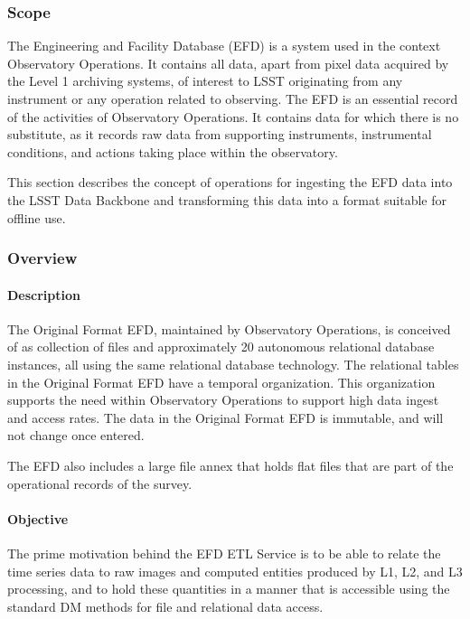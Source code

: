 \subsubsection{Scope}

The Engineering and Facility Database (EFD) is a system used in the
context Observatory Operations. It contains all data, apart from pixel
data acquired by the Level 1 archiving systems, of interest to LSST
originating from any instrument or any operation related to
observing. The EFD is an essential record of the activities of
Observatory Operations. It contains data for which there is no
substitute, as it records raw data from supporting instruments,
instrumental conditions, and actions taking place within the
observatory.

This section describes the concept of operations for ingesting the
EFD data into the LSST Data Backbone and transforming this data
into a format suitable for offline use.

\subsubsection{Overview}

\paragraph{Description}

The Original Format EFD, maintained by Observatory Operations, is
conceived of as collection of files and approximately 20 autonomous
relational database instances, all using the same relational database
technology. The relational tables in the Original Format EFD have a
temporal organization. This organization supports the need within
Observatory Operations to support high data ingest and access
rates. The data in the Original Format EFD is immutable, and will not
change once entered.

The EFD also includes a large file annex that holds flat files that
are part of the operational records of the survey.

\paragraph{Objective}

The prime motivation behind the EFD ETL Service is to be able to
relate the time series data to raw images and computed entities
produced by L1, L2, and L3 processing, and to hold these quantities in
a manner that is accessible using the standard DM methods for file and
relational data access.


